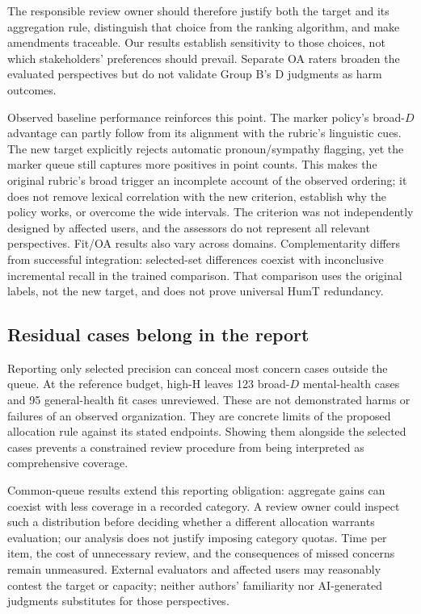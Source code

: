\documentclass[manuscript,screen,review,anonymous]{acmart}
\begin{document}
The responsible review owner should therefore justify both the target and its aggregation rule, distinguish that choice from the ranking algorithm, and make amendments traceable. Our results establish sensitivity to those choices, not which stakeholders' preferences should prevail. Separate OA raters broaden the evaluated perspectives but do not validate Group B's D judgments as harm outcomes.

Observed baseline performance reinforces this point. The marker policy's broad-$D$ advantage can partly follow from its alignment with the rubric's linguistic cues. The new target explicitly rejects automatic pronoun/sympathy flagging, yet the marker queue still captures more positives in point counts. This makes the original rubric's broad trigger an incomplete account of the observed ordering; it does not remove lexical correlation with the new criterion, establish why the policy works, or overcome the wide intervals. The criterion was not independently designed by affected users, and the assessors do not represent all relevant perspectives. Fit/OA results also vary across domains. Complementarity differs from successful integration: selected-set differences coexist with inconclusive incremental recall in the trained comparison. That comparison uses the original labels, not the new target, and does not prove universal HumT redundancy.

\subsection{Residual cases belong in the report}
Reporting only selected precision can conceal most concern cases outside the queue. At the reference budget, high-H leaves 123 broad-$D$ mental-health cases and 95 general-health fit cases unreviewed. These are not demonstrated harms or failures of an observed organization. They are concrete limits of the proposed allocation rule against its stated endpoints. Showing them alongside the selected cases prevents a constrained review procedure from being interpreted as comprehensive coverage.

Common-queue results extend this reporting obligation: aggregate gains can coexist with less coverage in a recorded category. A review owner could inspect such a distribution before deciding whether a different allocation warrants evaluation; our analysis does not justify imposing category quotas. Time per item, the cost of unnecessary review, and the consequences of missed concerns remain unmeasured. External evaluators and affected users may reasonably contest the target or capacity; neither authors' familiarity nor AI-generated judgments substitutes for those perspectives.
\end{document}
